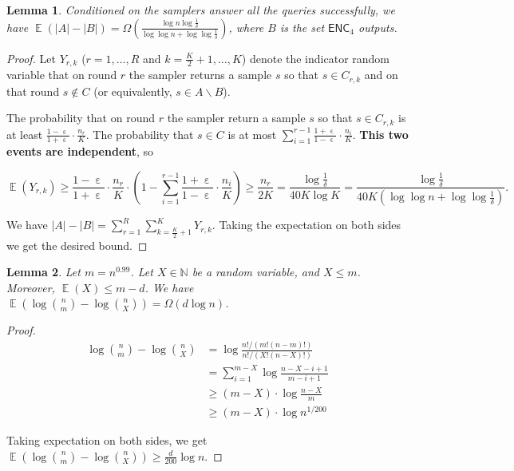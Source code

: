 \documentclass[10pt]{article}
\DeclareMathOperator*{\E}{\mathbb{E}}
\DeclareMathOperator*{\eps}{\varepsilon}
\newtheorem{lemma}{Lemma}
\newcommand{\enc}{\textsf{ENC}\xspace}
\begin{document}
\begin{lemma} \label{lemma:words-saving}
  Conditioned on the samplers answer all the queries successfully, we have $\E(|A|-|B|)=\Omega(\frac{\log n \log \frac{1}{\delta}}{\log\log n + \log\log \frac{1}{\delta}})$, where $B$ is the set $\enc_4$ outputs.
\end{lemma}

\begin{proof}
  Let $Y_{r,k}$ ($r=1,\ldots, R$ and $k=\frac{K}{2}+1,\ldots, K$) denote the indicator random variable that on round $r$ the sampler returns a sample $s$ so that $s\in C_{r,k}$ and on that round $s\not\in C$ (or equivalently, $s\in A\backslash B$).  
  
  The probability that on round $r$ the sampler return a sample $s$ so that $s\in C_{r,k}$ is at least $\frac{1-\eps}{1+\eps}\cdot \frac{n_r}{K}$. The probability that $s\in C$ is at most $\sum_{i=1}^{r-1}{\frac{1+\eps}{1-\eps}\cdot \frac{n_i}{K}}$. {\color{red}\textbf{This two events are independent}}, so 
  
  $$\E(Y_{r,k})\ge \frac{1-\eps}{1+\eps}\cdot \frac{n_r}{K} \cdot (1-\sum_{i=1}^{r-1}{\frac{1+\eps}{1-\eps}\cdot \frac{n_i}{K}}) \ge \frac{n_r}{2K}=\frac{\log \frac{1}{\delta}}{40K\log K}=\frac{\log \frac{1}{\delta}}{40K(\log\log n + \log\log \frac{1}{\delta})}.$$
  
   We have $|A|-|B|=\sum_{r=1}^{R}{\sum_{k=\frac{K}{2}+1}^{K}{Y_{r,k}}}$. Taking the expectation on both sides we get the desired bound.
  
\end{proof}

\begin{lemma} \label{lemma:bits-saving}
  Let $m=n^{0.99}$. Let $X\in \mathbb{N}$ be a random variable, and $X\le m$. Moreover, $\E(X)\le m-d$. We have $\E(\log {n \choose m}-\log {n \choose X})=\Omega(d \log n)$.
\end{lemma}

\begin{proof}
  \begin{align*}
    \log {n \choose m}-\log {n \choose X}
    &=   \log \frac{n!/(m!(n-m)!)}{n!/(X!(n-X)!)} \\
    &=   \sum_{i=1}^{m-X}\log \frac{n-X-i+1}{m-i+1} \\
    &\ge (m-X)\cdot \log \frac{n-X}{m} \\
    &\ge (m-X)\cdot \log n^{1/200}
  \end{align*}
  
  Taking expectation on both sides, we get $\E(\log {n \choose m}-\log {n \choose X})\ge \frac{d}{200} \log n$. 
\end{proof}
\end{document}
